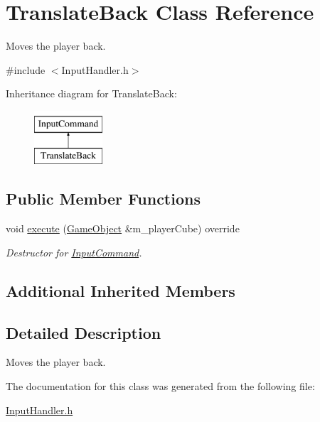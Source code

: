 \hypertarget{class_translate_back}{}\section{Translate\+Back Class Reference}
\label{class_translate_back}


Moves the player back.  




{\ttfamily \#include $<$Input\+Handler.\+h$>$}

Inheritance diagram for Translate\+Back\+:\begin{figure}[H]
\begin{center}
\leavevmode
\includegraphics[height=2.000000cm]{class_translate_back}
\end{center}
\end{figure}
\subsection*{Public Member Functions}
\begin{DoxyCompactItemize}
\item 
\mbox{\label{class_translate_back_a704b92f790961a172b053088e859e5b3}} 
void \mbox{\hyperlink{class_translate_back_a704b92f790961a172b053088e859e5b3}{execute}} (\mbox{\hyperlink{class_game_object}{Game\+Object}} \&m\+\_\+player\+Cube) override
\begin{DoxyCompactList}\small\item\em Destructor for \mbox{\hyperlink{class_input_command}{Input\+Command}}. \end{DoxyCompactList}\end{DoxyCompactItemize}
\subsection*{Additional Inherited Members}


\subsection{Detailed Description}
Moves the player back. 

The documentation for this class was generated from the following file\+:\begin{DoxyCompactItemize}
\item 
\mbox{\hyperlink{_input_handler_8h}{Input\+Handler.\+h}}\end{DoxyCompactItemize}
